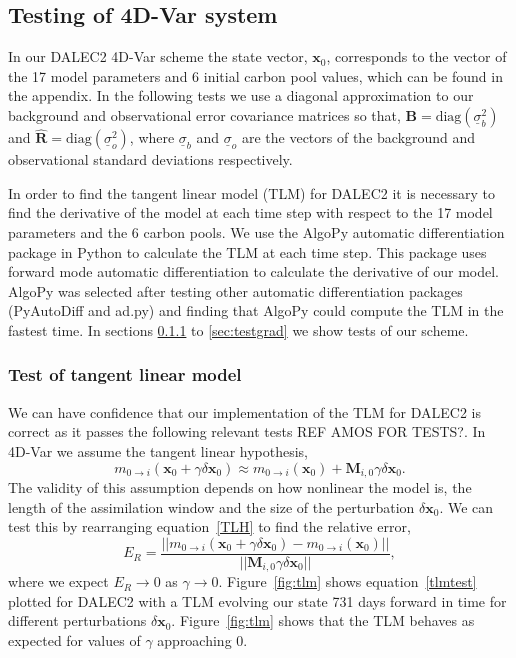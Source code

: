 \documentclass[11pt]{article}
\begin{document}
\subsection{Testing of 4D-Var system}

In our DALEC2 4D-Var scheme the state vector, $\textbf{x}_0$, corresponds to the vector of the 17 model parameters and 6 initial carbon pool values, which can be found in the appendix. In the following tests we use a diagonal approximation to our background and observational error covariance matrices so that, 
$\textbf{B}=\text{diag}(\underline{\sigma}_b^2)$ and $\hat{\textbf{R}}=\text{diag}(\underline{\sigma}_o^2 )$,
where $\underline{\sigma}_b$ and $\underline{\sigma}_o$ are the vectors of the background and observational standard deviations respectively.

In order to find the tangent linear model (TLM) for DALEC2 it is necessary to find the derivative of the model at each time step with respect to the 17 model parameters and the 6 carbon pools. We use the AlgoPy automatic differentiation package in Python to calculate the TLM at each time step. This package uses forward mode automatic differentiation to calculate the derivative of our model. AlgoPy was selected after testing other automatic differentiation packages (PyAutoDiff and ad.py) and finding that AlgoPy could compute the TLM in the fastest time. In sections \ref{sec:testtlm} to \ref{sec:testgrad} we show tests of our scheme.

\subsubsection{Test of tangent linear model} \label{sec:testtlm}

We can have confidence that our implementation of the TLM for DALEC2 is correct as it passes the following relevant tests REF AMOS FOR TESTS?. In 4D-Var we assume the tangent linear hypothesis,
\begin{equation}
m_{0\rightarrow i}(\mathbf{x}_0+\gamma \delta\mathbf{x}_0) \approx m_{0 \rightarrow i}(\mathbf{x}_0) + \mathbf{M}_{i,0}\gamma \delta\mathbf{x}_0. \label{TLH}
\end{equation}
The validity of this assumption depends on how nonlinear the model is, the length of the assimilation window and the size of the perturbation $\delta\mathbf{x}_0$. We can test this by rearranging equation~\ref{TLH} to find the relative error,
\begin{equation}
E_R=\frac{||m_{0\rightarrow i}(\mathbf{x}_0+\gamma \delta\mathbf{x}_0) - m_{0 \rightarrow i}(\mathbf{x}_0)||}{||\mathbf{M}_{i,0}\gamma\delta\mathbf{x}_0||}, \label{tlmtest}
\end{equation}
where we expect $E_R \rightarrow 0$ as $\gamma \rightarrow 0$. Figure~\ref{fig:tlm} shows equation~\ref{tlmtest} plotted for DALEC2 with a TLM evolving our state 731 days forward in time for different perturbations $\delta \textbf{x}_0$. Figure~\ref{fig:tlm} shows that the TLM behaves as expected for values of $\gamma$ approaching $0$.
\end{document}
